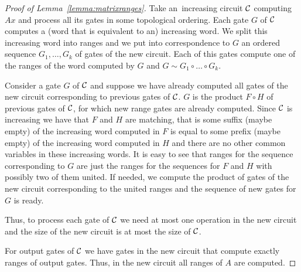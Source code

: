 \documentclass[11pt,letterpaper]{article}
\begin{document}
\begin{proof}[Proof of Lemma~\ref{lemma:matrixranges}]
Take an~increasing circuit ${\cal C}$ computing $Ax$ and process all its gates in some topological ordering. Each gate $G$ of ${\cal C}$ computes a (word that is equivalent to an) increasing word. We split this increasing word into ranges and we put into correspondence to $G$ an ordered sequence $G_1,\ldots, G_k$ of gates of the new circuit. Each of this gates compute one of the ranges of the word computed by $G$ and $G \sim G_1\circ\ldots \circ G_k$.

Consider a gate $G$ of ${\cal C}$ and suppose we have already computed all gates of the new circuit corresponding to previous gates of ${\cal C}$. $G$ is the product $F \circ H$ of previous gates of ${\cal C}$, for which new range gates are already computed. Since ${\cal C}$ is increasing we have that $F$ and $H$ are matching, that is some suffix (maybe empty) of the increasing word computed in $F$ is equal to some prefix (maybe empty) of the increasing word computed in $H$ and there are no other common variables in these increasing words. It is easy to see that ranges for the sequence corresponding to $G$ are just the ranges for the sequences for $F$ and $H$ with possibly two of them united. If needed, we compute the product of gates of the new circuit corresponding to the united ranges and the sequence of new gates for $G$ is ready.

Thus, to process each gate of ${\cal C}$ we need at most one operation in the new circuit and the size of the new circuit is at most the size of ${\cal C}$.

For output gates of ${\cal C}$ we have gates in the new circuit that compute exactly ranges of output gates. Thus, in the new circuit all ranges of $A$ are computed.
\end{proof}








\end{document}
